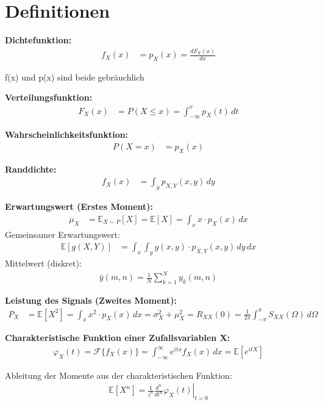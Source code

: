 \section{Definitionen}

\textbf{Dichtefunktion:}
\begin{align}
f_X(x) &= p_X(x) = \frac{dF_X(x)}{dx}
\end{align}

f(x) und p(x) sind beide gebräuchlich

\textbf{Verteilungsfunktion:}
\begin{align}
F_X(x) &= P(X \leq x) = \int_{-\infty}^{x} p_X(t) \, dt
\end{align}

\textbf{Wahrscheinlichkeitsfunktion:}
\begin{align}
P(X = x) &= p_X(x)
\end{align}

\textbf{Randdichte:}
\begin{align}
f_X(x) &= \int_{y} p_{X,Y}(x,y) \, dy
\end{align}

\textbf{Erwartungswert (Erstes Moment):}
\begin{align}
\mu_X &= \mathbb{E}_{X \sim P}[X] = \mathbb{E}[X] = \int_{x} x \cdot p_X(x) \, dx
\end{align}
Gemeinsamer Erwartungswert:
\begin{align}
\mathbb{E}[g(X,Y)] &= \int_{x}\int_{y} g(x,y) \cdot p_{X,Y}(x,y) \, dy \, dx
\end{align}
Mittelwert (diskret):
\begin{align}
\bar{y}(m,n) = \frac{1}{N}\sum_{k=1}^{N}y_k(m,n)
\end{align}

\textbf{Leistung des Signals (Zweites Moment):}
\begin{align}
P_X &= \mathbb{E}[X^2] = \int_{x} x^2 \cdot p_X(x) \, dx = \sigma_X^2 + \mu_X^2 = R_{XX}(0) = \frac{1}{2\pi} \int_{-\pi}^{\pi} S_{XX}(\Omega) \, d\Omega
\end{align}

\textbf{Charakteristische Funktion einer Zufallsvariablen X:}
\begin{align}
\varphi_X(t) = \mathcal{F}\{f_X(x)\} = \int_{-\infty}^{\infty} e^{itx} f_X(x) \, dx =\mathbb{E}[e^{itX}]
\end{align}

Ableitung der Momente aus der charakteristischen Funktion:
\begin{align}
\mathbb{E}[X^n] = \frac{1}{i^n} \left. \frac{d^n}{dt^n} \varphi_X(t) \right|_{t=0}
\end{align}

